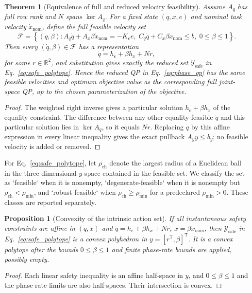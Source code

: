 \documentclass[preprint,12pt]{elsarticle}
\newcommand{\R}{\mathbb{R}}
\newcommand{\T}{^{\mathsf T}}
\newtheorem{theorem}{Theorem}
\newtheorem{proposition}{Proposition}
\begin{document}
\begin{theorem}[Equivalence of full and reduced velocity feasibility]
\label{thm:full_reduced_equivalence}
Assume $A_q$ has full row rank and $N$ spans $\ker A_q$. For a fixed state $(q,x,e)$ and nominal task velocity $\dot x_{\mathrm{nom}}$, define the full feasible velocity set
\begin{equation}
\mathcal F=\left\{(\dot q,\beta):
A_q\dot q+A_x\beta\dot x_{\mathrm{nom}}=-K_e e,\;
C_q\dot q+C_x\beta\dot x_{\mathrm{nom}}\leq b,\;0\leq\beta\leq1\right\}.
\label{eq:full_feasible_set}
\end{equation}
Then every $(\dot q,\beta)\in\mathcal F$ has a representation
\begin{equation}
\dot q=h_e+\beta h_x+Nr,
\end{equation}
for some $r\in\R^2$, and substitution gives exactly the reduced set $\mathcal Y_{\mathrm{safe}}$ in Eq.~\eqref{eq:safe_polytope}. Hence the reduced QP in Eq.~\eqref{eq:phase_qp} has the same feasible velocities and optimum objective value as the corresponding full joint-space QP, up to the chosen parameterization of the objective.
\end{theorem}
\begin{proof}
The weighted right inverse gives a particular solution $h_e+\beta h_x$ of the equality constraint. The difference between any other equality-feasible $\dot q$ and this particular solution lies in $\ker A_q$, so it equals $Nr$. Replacing $\dot q$ by this affine expression in every linear inequality gives the exact pullback $A_y y\leq b_y$; no feasible velocity is added or removed.
\end{proof}

\begin{definition}
For Eq.~\eqref{eq:safe_polytope}, let $\rho_{\mathrm{ch}}$ denote the largest radius of a Euclidean ball in the three-dimensional $y$-space contained in the feasible set. We classify the set as `feasible` when it is nonempty, `degenerate-feasible` when it is nonempty but $\rho_{\mathrm{ch}}<\rho_{\min}$, and `robust-feasible` when $\rho_{\mathrm{ch}}\geq\rho_{\min}$ for a predeclared $\rho_{\min}>0$. These classes are reported separately.
\end{definition}

\begin{proposition}[Convexity of the intrinsic action set]
\label{prop:convexity}
If all instantaneous safety constraints are affine in $(\dot q,\dot x)$ and $\dot q=h_e+\beta h_x+Nr$, $\dot x=\beta\dot x_{\mathrm{nom}}$, then $\mathcal Y_{\mathrm{safe}}$ in Eq.~\eqref{eq:safe_polytope} is a convex polyhedron in $y=[r\T,\beta]\T$. It is a convex polytope after the bounds $0\leq\beta\leq1$ and finite phase-rate bounds are applied, possibly empty.
\end{proposition}
\begin{proof}
Each linear safety inequality is an affine half-space in $y$, and $0\leq\beta\leq1$ and the phase-rate limits are also half-spaces. Their intersection is convex.
\end{proof}
\end{document}
